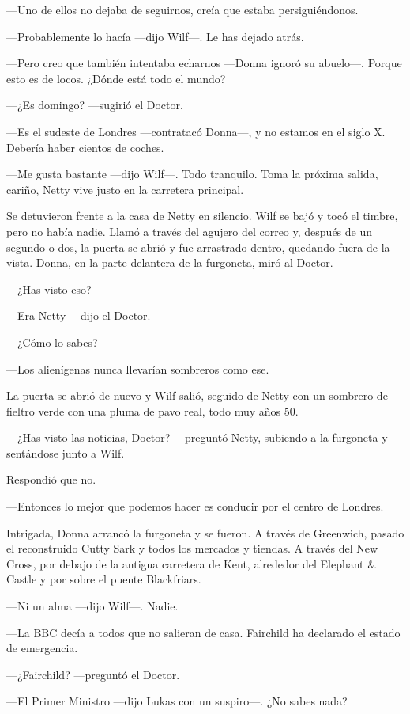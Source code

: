 ---Uno de ellos no dejaba de seguirnos, creía que estaba
persiguiéndonos.

---Probablemente lo hacía ---dijo Wilf---. Le has dejado atrás.

---Pero creo que también intentaba echarnos ---Donna ignoró su
abuelo---. Porque esto es de locos. ¿Dónde está todo el mundo?

---¿Es domingo? ---sugirió el Doctor.

---Es el sudeste de Londres ---contratacó Donna---, y no estamos en el
siglo X. Debería haber cientos de coches.

---Me gusta bastante ---dijo Wilf---. Todo tranquilo. Toma la próxima
salida, cariño, Netty vive justo en la carretera principal.

Se detuvieron frente a la casa de Netty en silencio. Wilf se bajó y tocó
el timbre, pero no había nadie. Llamó a través del agujero del correo y,
después de un segundo o dos, la puerta se abrió y fue arrastrado dentro,
quedando fuera de la vista. Donna, en la parte delantera de la
furgoneta, miró al Doctor.

---¿Has visto eso?

---Era Netty ---dijo el Doctor.

---¿Cómo lo sabes?

---Los alienígenas nunca llevarían sombreros como ese.

La puerta se abrió de nuevo y Wilf salió, seguido de Netty con un
sombrero de fieltro verde con una pluma de pavo real, todo muy años 50.

---¿Has visto las noticias, Doctor? ---preguntó Netty, subiendo a la
furgoneta y sentándose junto a Wilf.

Respondió que no.

---Entonces lo mejor que podemos hacer es conducir por el centro de
Londres.

Intrigada, Donna arrancó la furgoneta y se fueron. A través de
Greenwich, pasado el reconstruido Cutty Sark y todos los mercados y
tiendas. A través del New Cross, por debajo de la antigua carretera de
Kent, alrededor del Elephant \& Castle y por sobre el puente
Blackfriars.

---Ni un alma ---dijo Wilf---. Nadie.

---La BBC decía a todos que no salieran de casa. Fairchild ha declarado
el estado de emergencia.

---¿Fairchild? ---preguntó el Doctor.

---El Primer Ministro ---dijo Lukas con un suspiro---. ¿No sabes nada?

